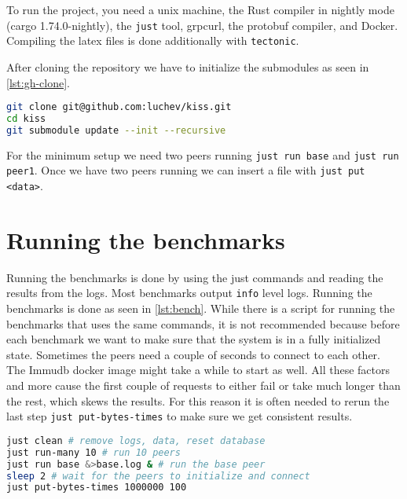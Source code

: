 To run the project, you need a unix machine,
the Rust compiler in nightly mode (cargo 1.74.0-nightly),
the \texttt{just} tool, grpcurl, the protobuf compiler, and Docker.
Compiling the latex files is done additionally with \texttt{tectonic}.

After cloning the repository we have to initialize the submodules as seen in \autoref{lst:gh-clone}.
\begin{lstlisting}[language=bash, caption={Cloning and setting up the repository}, label={lst:gh-clone}]
git clone git@github.com:luchev/kiss.git
cd kiss
git submodule update --init --recursive
\end{lstlisting}

For the minimum setup we need two peers running \texttt{just run base} and \texttt{just run peer1}.
Once we have two peers running we can insert a file with \texttt{just put <data>}.

\section{Running the benchmarks}

Running the benchmarks is done by using the just commands and reading the results from the logs.
Most benchmarks output \texttt{info} level logs.
Running the benchmarks is done as seen in \autoref{lst:bench}.
While there is a script for running the benchmarks that uses the same commands, 
it is not recommended because before each benchmark we want to make sure that
the system is in a fully initialized state.
Sometimes the peers need a couple of seconds to connect to each other.
The Immudb docker image might take a while to start as well.
All these factors and more cause the first couple of requests to either fail or take
much longer than the rest, which skews the results.
For this reason it is often needed to rerun the last step \texttt{just put-bytes-times}
to make sure we get consistent results.

\begin{lstlisting}[language=bash, caption={Running the benchmarks}, label={lst:bench}]
just clean # remove logs, data, reset database
just run-many 10 # run 10 peers
just run base &>base.log & # run the base peer
sleep 2 # wait for the peers to initialize and connect
just put-bytes-times 1000000 100
\end{lstlisting}
